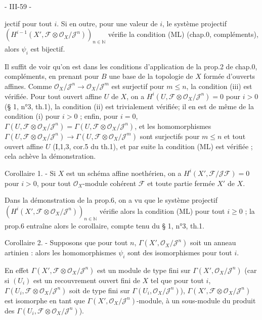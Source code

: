 \newpage


- III-59 -

jectif pour tout $i$. Si en outre, pour une valeur de $i$, le système projectif $(H^{i-1}(X', \mathcal{F} \otimes \mathcal{O}_X / \mathcal{J}^n))_{n \in \mathbb{N}}$ vérifie la condition (ML) (chap.0, compléments), alors $\psi_i$ est bijectif.

Il suffit de voir qu'on est dans les conditions d'application de la prop.2 de chap.0, compléments, en prenant pour $B$ une base de la topologie de $X$ formée d'ouverts affines. Comme $\mathcal{O}_X / \mathcal{J}^n \to \mathcal{O}_X / \mathcal{J}^m$ est surjectif pour $m \leq n$, la condition (iii) est vérifiée. Pour tout ouvert affine $U$ de $X$, on a $H^i(U, \mathcal{F} \otimes \mathcal{O}_X / \mathcal{J}^n) = 0$ pour $i > 0$ (§ 1, n°3, th.1), la condition (ii) est trivialement vérifiée; il en est de même de la condition (i) pour $i > 0$ ; enfin, pour $i=0$, $\Gamma(U, \mathcal{F} \otimes \mathcal{O}_X / \mathcal{J}^n) = \Gamma(U, \mathcal{F} \otimes \mathcal{O}_X / \mathcal{J}^n)$, et les homomorphismes $\Gamma(U, \mathcal{F} \otimes \mathcal{O}_X / \mathcal{J}^n) \to \Gamma(U, \mathcal{F} \otimes \mathcal{O}_X / \mathcal{J}^m)$ sont surjectifs pour $m \leq n$ et tout ouvert affine $U$ (I,1,3, cor.5 du th.1), et par suite la condition (ML) est vérifiée ; cela achève la démonstration.

Corollaire 1. - Si $X$ est un schéma affine noethérien, on a $H^i(X', \mathcal{F}/ \mathcal{J}\mathcal{F}) = 0$ pour $i > 0$, pour tout $\mathcal{O}_X$-module cohérent $\mathcal{F}$ et toute partie fermée $X'$ de $X$.

Dans la démonstration de la prop.6, on a vu que le système projectif $(H^i(X', \mathcal{F} \otimes \mathcal{O}_X / \mathcal{J}^n))_{n \in \mathbb{N}}$ vérifie alors la condition (ML) pour tout $i \geq 0$ ; la prop.6 entraîne alors le corollaire, compte tenu du § 1, n°3, th.1.

Corollaire 2. - Supposons que pour tout $n$, $\Gamma(X', \mathcal{O}_X / \mathcal{J}^n)$ soit un anneau artinien : alors les homomorphismes $\psi_i$ sont des isomorphismes pour tout $i$.

En effet $\Gamma(X', \mathcal{F} \otimes \mathcal{O}_X / \mathcal{J}^n)$ est un module de type fini sur $\Gamma(X', \mathcal{O}_X / \mathcal{J}^n)$ (car si $(U_i)$ est un recouvrement ouvert fini de $X$ tel que pour tout $i$, $\Gamma(U_i, \mathcal{F} \otimes \mathcal{O}_X / \mathcal{J}^n)$ soit de type fini sur $\Gamma(U_i, \mathcal{O}_X / \mathcal{J}^n)$), $\Gamma(X', \mathcal{F} \otimes \mathcal{O}_X / \mathcal{J}^n)$ est isomorphe en tant que $\Gamma(X', \mathcal{O}_X / \mathcal{J}^n)$-module, à un sous-module du produit des $\Gamma(U_i, \mathcal{F} \otimes \mathcal{O}_X / \mathcal{J}^n)$).

